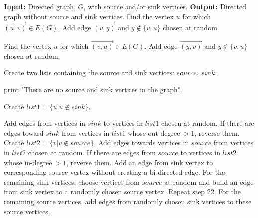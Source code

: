 \documentclass[%
 reprint,
 superscriptaddress,
 amsmath,amssymb,
 aps,
 pra,
floatfix,
nofootinbib,
]{revtex4-2}
\theoremstyle{definition}
\theoremstyle{remark}
\begin{document}
\begin{appendix}
\begin{algorithm} 
    \caption{To modify source/sink vertices to non-source/non-sink vertices}\label {alg:source_sink}
    
    \begin{algorithmic}[1]
    \Statex \textbf{Input:} Directed graph, $G$, with source and/or sink vertices.
    \Statex \textbf{Output:} Directed graph without source and sink vertices. 
                \State Find the vertex $u$ for which $\overrightarrow{(u, v)} \in E(G)$.
                \State Add edge $\overrightarrow{(v, y)}$ and $y \notin \{v, u\}$ chosen at random.

            \Else 
                \State Find the vertex $u$ for which $\overrightarrow{(v, u)} \in E(G)$.
                \State Add edge $\overrightarrow{(y, v)}$ and $y \notin \{v, u\}$ chosen at random.
            \EndIf
        \EndIf
    \EndFor

    \State Create two lists containing the source and sink vertices: $source, \ sink$.

        \State print "There are no source and sink vertices in the graph".
        
        \State Create $list1 = \{u | u \notin sink\}$.
        
        \State Add edges from vertices in $sink$ to vertices in $list1$ chosen at random. If there are edges toward $sink$ from vertices in $list1$ whose out-degree$~>1$, reverse them. 
            \State Create $list2 = \{v | v \notin source\}$.
            \State Add edges towards vertices in $source$ from vertices in $list2$ chosen at random. If there are edges from $source$ to vertices in $list2$ whose in-degree$~>1$, reverse them.
            \State Add an edge from sink vertex to corresponding source vertex without creating a bi-directed edge.
            \State For the remaining sink vertices, choose vertices from $source$ at random and build an edge from sink vertex to a randomly chosen source vertex.
    \Else 
                \State Repeat step 22.
                \State For the remaining source vertices, add edges from randomly chosen sink vertices to these source vertices.         
    \EndIf
  \end{algorithmic}
\end{algorithm}


\end{appendix}
\end{document}

